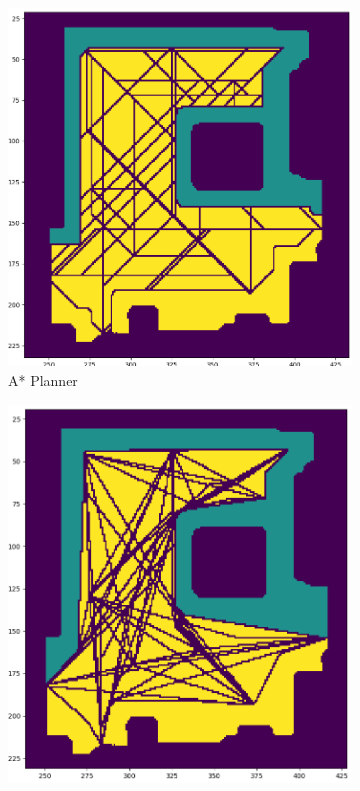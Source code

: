 \begin{figure}[h]
    \captionsetup[subfigure]{justification=centering}
    \centering
    \begin{subfigure}{.25\textwidth}
      \centering
      \includegraphics[width=\textwidth]{figures/60_results/room2_disturbance_astar_unsmoothed.png}
      \caption{A* Planner}
    \end{subfigure}%
    \begin{subfigure}{.24\textwidth}
      \centering
      \includegraphics[width=\textwidth]{figures/60_results/room2_disturbance_astar_smooth.png}

\end{subfigure}
\end{figure}

